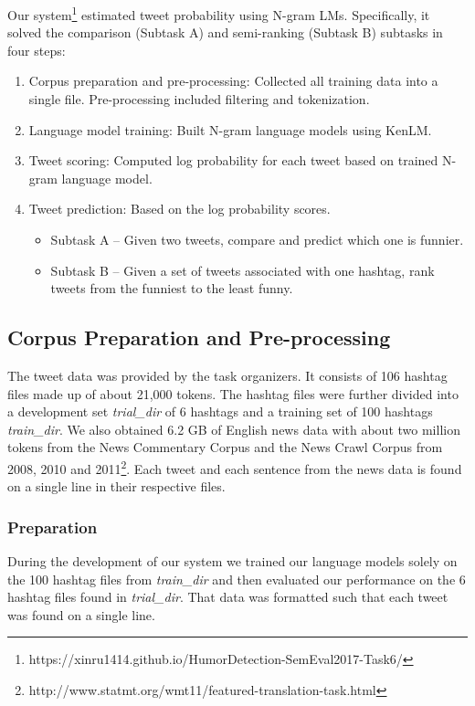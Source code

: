 \documentclass[11pt,a4paper]{article}
\begin{document}
Our system\footnote{https://xinru1414.github.io/HumorDetection-SemEval2017-Task6/} estimated tweet probability using N-gram LMs. 
Specifically, it solved the comparison (Subtask A) and semi-ranking (Subtask B) subtasks in four steps:

\begin{enumerate}
\item Corpus preparation and pre-processing: Collected all training 
data into a single file.
Pre-processing included filtering and tokenization.
\item Language model training: Built N-gram language models using KenLM.
\item Tweet scoring: Computed log probability for each tweet based 
on trained N-gram language model. 
\item Tweet prediction: Based on the log probability scores.   

\begin{itemize}
\item Subtask A -- Given two tweets, compare and predict which one is funnier. 
\item Subtask B -- Given a set of tweets associated with one hashtag, rank 
tweets from the funniest to the least funny.

\end{itemize}
\end{enumerate}

\subsection{Corpus Preparation and Pre-processing}

The tweet data was provided by the task organizers. It consists of 106 hashtag files made up of about 21,000 tokens. The hashtag files
were further divided into a development set \textit{trial\_dir} of 6 hashtags and a training set of 100 hashtags \textit{train\_dir}. 
We also obtained 6.2 GB of English news data with about two million tokens from the News 
Commentary Corpus and the News Crawl Corpus from 2008, 2010 and 2011\footnote{http://www.statmt.org/wmt11/featured-translation-task.html}.   
Each tweet and each sentence from the news data is found on a single line in their respective files.

\subsubsection{Preparation}

During the development of our system we trained our language models solely on the 100 hashtag files from \textit{train\_dir}
and then evaluated our performance on the 6 hashtag files found in \textit{trial\_dir}. That data was formatted such that each
tweet was found on a single line.  
\end{document}
